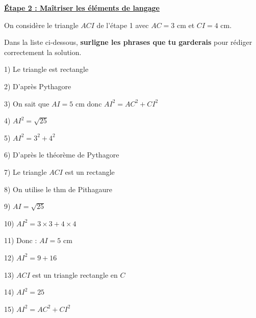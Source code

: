 \documentclass[12pt,a4paper]{article}
\begin{document}
\vspace{0.45em}


{\sffamily\large\bfseries\underline{Étape 2 : Maîtriser les éléments de langage}}

\smallskip

On considère le triangle \(ACI\) de l'étape 1 avec
\(AC=3\) cm et \(CI=4\) cm.

\smallskip

Dans la liste ci-dessous, \textbf{surligne les phrases que tu garderais}
pour rédiger correctement la solution.

\medskip

\begin{tcolorbox}[
  enhanced,
  colback=white,
  colframe=black!55,
  boxrule=0.5pt,
  arc=0mm,
  left=3mm,
  right=3mm,
  top=1.5mm,
  bottom=1.5mm
]

\small

\begin{minipage}[t]{0.49\linewidth}

1) Le triangle est rectangle

\smallskip

2) D'après Pythagore

\smallskip

3) On sait que \(AI=5\) cm donc
\(AI^2=AC^2+CI^2\)

\smallskip

4) \(AI^2=\sqrt{25}\)

\smallskip

5) \(AI^2=3^2+4^2\)

\smallskip

6) D'après le théorème de Pythagore

\smallskip

7) Le triangle \(ACI\) est un rectangle

\smallskip

8) On utilise le thm de Pithagaure

\end{minipage}
\hfill
\begin{minipage}[t]{0.49\linewidth}

9) \(AI=\sqrt{25}\)

\smallskip

10) \(AI^2=3\times3+4\times4\)

\smallskip

11) Donc : \(AI=5\) cm

\smallskip

12) \(AI^2=9+16\)

\smallskip

13) \(ACI\) est un triangle rectangle en \(C\)

\smallskip

14) \(AI^2=25\)

\smallskip

15) \(AI^2=AC^2+CI^2\)

\end{minipage}

\end{tcolorbox}
\end{document}
